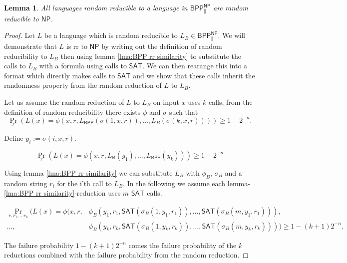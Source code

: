 \documentclass{article}
\newtheorem{lemma}[theorem]{Lemma}
\begin{document}
\begin{lemma}\label{lma: rr to BPP NP parallel is rr to NP}
    All languages random reducible to a language in $\mathsf{BPP^{NP}_{\parallel}}$ are random reducible to $\mathsf{NP}$.
\end{lemma}
\begin{proof}Let $L$ be a language which is random reducible to $L_B\in \mathsf{BPP^{NP}_{\parallel}}$. We will demonstrate that $L$ is rr to $\mathsf{NP}$ by writing out the definition of random reducibility to ${L_B}$ then using lemma \ref{lma:BPP rr similarity} to substitute the calls to ${L_B}$ with a formula using calls to $\mathsf{SAT}$. We can then rearange this into a format which directly makes calls to $\mathsf{SAT}$ and we show that these calls inherit the randomness property from the random reduction of $L$ to $L_B$.

    Let us assume the random reduction of $L$ to $L_B$ on input $x$ uses $k$ calls, from the definition of random reducibility there exists $\phi$ and $\sigma$ such that
    \[
\Pr_{r}\left(
            L(x)=\phi(x,r,L_{\mathsf{BPP}}(\sigma(1,x,r)),\ldots, L_{{B}}(\sigma(k, x, r)))
            \right)\geq 1-2^{-n}.
\]

Define $y_i:=\sigma(i, x, r)$. 

\[
\Pr_{r}\left(
            L(x)=\phi(x,r,L_{\mathsf{B}}(y_1),\ldots, L_{\mathsf{BPP}}(y_k))
            \right)\geq 1-2^{-n}
\]

Using lemma \ref{lma:BPP rr similarity} we can substitute $L_B$ with $\phi_B$, $\sigma_B$ and a random string $r_i$ for the i'th call to $L_B$. In the following we assume each lemma-\ref{lma:BPP rr similarity}-reduction uses $m$ $\mathsf{SAT}$ calls.

\begin{align*}
\Pr_{r, r_1, \ldots r_k}\big(
            L(x)=\phi(x,r,&\phi_{B}(y_1,r_1,\mathsf{SAT}(\sigma_{B}(1,y_1,r_1)),
            \ldots, \mathsf{SAT}(\sigma_{B}(m, y_1, r_1))),\\ \ldots, &\phi_{B}(y_k,r_k,\mathsf{SAT}(\sigma_{B}(1,y_k,r_k)), \ldots, \mathsf{SAT}(\sigma_{B}(m,y_k,r_k)))
            \big)
            \geq 1-(k+1)2^{-n}.
\end{align*}

The failure probability $1-(k+1)2^{-n}$ comes the failure probability of the $k$ reductions combined with the failure probability from the random reduction.


\end{proof}
\end{document}
